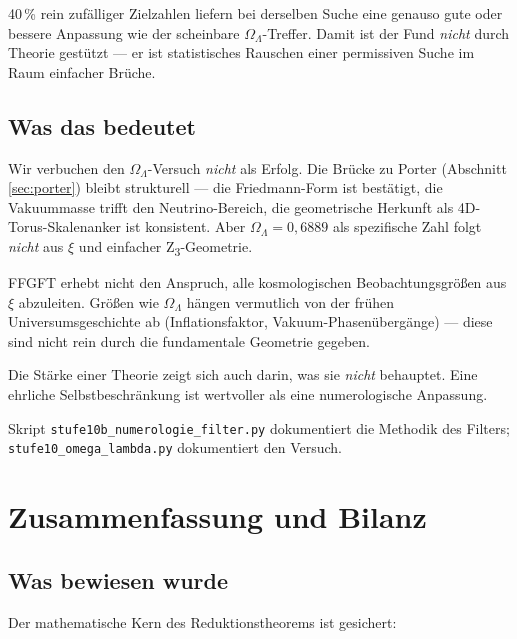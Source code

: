 \begin{important}
40\,\% rein zufälliger Zielzahlen liefern bei derselben Suche eine genauso gute oder bessere Anpassung wie der scheinbare \(\Omega_\Lambda\)-Treffer. Damit ist der Fund \emph{nicht} durch Theorie gestützt — er ist statistisches Rauschen einer permissiven Suche im Raum einfacher Brüche.
\end{important}

\subsection{Was das bedeutet}

Wir verbuchen den \(\Omega_\Lambda\)-Versuch \emph{nicht} als Erfolg. Die Brücke zu Porter (Abschnitt \ref{sec:porter}) bleibt strukturell — die Friedmann-Form ist bestätigt, die Vakuummasse trifft den Neutrino-Bereich, die geometrische Herkunft als 4D-Torus-Skalenanker ist konsistent. Aber \(\Omega_\Lambda = 0{,}6889\) als spezifische Zahl folgt \emph{nicht} aus \(\xi\) und einfacher Z\textsubscript{3}-Geometrie.

\begin{philosophical}
FFGFT erhebt nicht den Anspruch, alle kosmologischen Beobachtungsgrößen aus \(\xi\) abzuleiten. Größen wie \(\Omega_\Lambda\) hängen vermutlich von der frühen Universumsgeschichte ab (Inflationsfaktor, Vakuum-Phasenübergänge) — diese sind nicht rein durch die fundamentale Geometrie gegeben.

Die Stärke einer Theorie zeigt sich auch darin, was sie \emph{nicht} behauptet. Eine ehrliche Selbstbeschränkung ist wertvoller als eine numerologische Anpassung.
\end{philosophical}

Skript \texttt{stufe10b\_numerologie\_filter.py} dokumentiert die Methodik des Filters; \texttt{stufe10\_omega\_lambda.py} dokumentiert den Versuch.

\section{Zusammenfassung und Bilanz}
\label{sec:bilanz}

\subsection{Was bewiesen wurde}

Der mathematische Kern des Reduktionstheorems ist gesichert:

